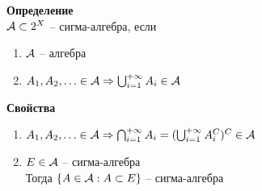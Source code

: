 \documentclass[12pt]{article}
\begin{document}
\textbf{Определение}\\
$\mathcal{A} \subset 2^X$ -- сигма-алгебра, если 
\begin{enumerate}
    \item $\mathcal{A}$ -- алгебра
    \item $A_1, A_2, \ldots \in \mathcal A\Rightarrow \bigcup_{i=1}^{+\infty} A_i \in \mathcal{A}$
\end{enumerate}
\textbf{Свойства}
\begin{enumerate}
    \item $A_1, A_2, \ldots \in \mathcal A\Rightarrow \bigcap_{i=1}^{+\infty} A_i = (\bigcup_{i=1}^{+\infty} A_i^C)^C \in \mathcal{A}$
    \item $E \in \mathcal{A}$ -- сигма-алгебра\\
    Тогда $\{A\in \mathcal{A}: A \subset E\}$ -- сигма-алгебра
\end{enumerate}
\end{document}
